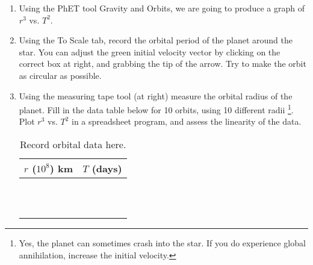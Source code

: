 \documentclass{article}
\begin{document}
\begin{enumerate}
\item Using the PhET tool Gravity and Orbits, we are going to produce a graph of $r^3$ vs. $T^2$.
\item Using the To Scale tab, record the orbital period of the planet around the star.  You can adjust the green initial velocity vector by clicking on the correct box at right, and grabbing the tip of the arrow. Try to make the orbit as circular as possible.
\item Using the measuring tape tool (at right) measure the orbital radius of the planet.  Fill in the data table below for 10 orbits, using 10 different radii \footnote{Yes, the planet can sometimes crash into the star.  If you do experience global annihilation, increase the initial velocity.}.  Plot $r^3$ vs. $T^2$ in a spreadsheet program, and assess the linearity of the data.
\begin{table}[hb]
\centering
\begin{tabular}{| c | c |}
\hline
$r$ ($10^8$) km & $T$ (days) \\ \hline
 &  \\ \hline
 &  \\ \hline
 &  \\ \hline
 &  \\ \hline
 &  \\ \hline
 &  \\ \hline
 &  \\ \hline
 &  \\ \hline
 &  \\ \hline
 &  \\ \hline
 &  \\ \hline
\end{tabular}
\caption{\label{tab:data} Record orbital data here.}
\end{table}

\end{enumerate}
\end{document}
